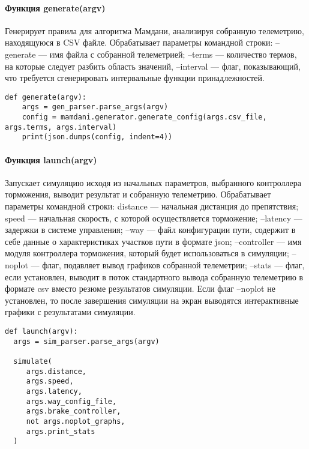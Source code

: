 \paragraph{Функция generate(argv)}

 Генерирует правила для алгоритма Мамдани, анализируя собранную телеметрию, находящуюся в CSV файле. Обрабатывает параметры командной строки: --generate — имя файла с собранной телеметрией; --terms —  количество термов, на которые следует разбить область значений, --interval — флаг, показывающий, что требуется сгенерировать интервальные функции принадлежностей.

\begin{lstlisting}[style=pythonstyle,caption={ }, label=lst:func:1]
  def generate(argv):
    args = gen_parser.parse_args(argv)
    config = mamdani.generator.generate_config(args.csv_file, args.terms, args.interval)
    print(json.dumps(config, indent=4))
\end{lstlisting}

\paragraph{Функция launch(argv)}

Запускает симуляцию исходя из начальных параметров, выбранного контроллера торможения, выводит результат и собранную телеметрию. Обрабатывает параметры командной строки: distance — начальная дистанция до препятствия; speed — начальная скорость, с которой осуществляется торможение; --latency — задержки в системе управления; --way — файл конфигурации пути, содержит в себе данные о характеристиках участков пути в формате json; --controller — имя модуля контроллера торможения, который будет использоваться в симуляции; --noplot — флаг, подавляет вывод графиков собранной телеметрии; --stats — флаг, если установлен, выводит в поток стандартного вывода собранную телеметрию в формате csv вместо резюме результатов  симуляции. Если флаг --noplot не установлен, то после завершения симуляции на экран выводятся интерактивные графики с результатами симуляции.

\begin{lstlisting}[style=pythonstyle,caption={}, label=lst:func:1]
def launch(argv):
  args = sim_parser.parse_args(argv)

  simulate(
     args.distance,
     args.speed,
     args.latency,
     args.way_config_file,
     args.brake_controller,
     not args.noplot_graphs,
     args.print_stats
  )
\end{lstlisting}

